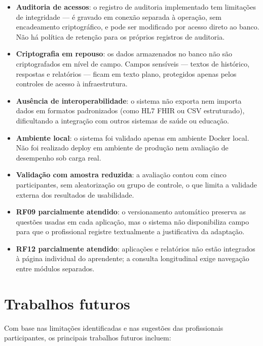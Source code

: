 \begin{itemize}
    \item \textbf{Auditoria de acessos}: o registro de auditoria implementado tem limitações de integridade — é gravado em conexão separada à operação, sem encadeamento criptográfico, e pode ser modificado por acesso direto ao banco. Não há política de retenção para os próprios registros de auditoria.
    \item \textbf{Criptografia em repouso}: os dados armazenados no banco não são criptografados em nível de campo. Campos sensíveis — textos de histórico, respostas e relatórios — ficam em texto plano, protegidos apenas pelos controles de acesso à infraestrutura.
    \item \textbf{Ausência de interoperabilidade}: o sistema não exporta nem importa dados em formatos padronizados (como HL7 FHIR ou CSV estruturado), dificultando a integração com outros sistemas de saúde ou educação.
    \item \textbf{Ambiente local}: o sistema foi validado apenas em ambiente Docker local. Não foi realizado deploy em ambiente de produção nem avaliação de desempenho sob carga real.
    \item \textbf{Validação com amostra reduzida}: a avaliação contou com cinco participantes, sem aleatorização ou grupo de controle, o que limita a validade externa dos resultados de usabilidade.
    \item \textbf{RF09 parcialmente atendido}: o versionamento automático preserva as questões usadas em cada aplicação, mas o sistema não disponibiliza campo para que o profissional registre textualmente a justificativa da adaptação.
    \item \textbf{RF12 parcialmente atendido}: aplicações e relatórios não estão integrados à página individual do aprendente; a consulta longitudinal exige navegação entre módulos separados.
\end{itemize}

\section{Trabalhos futuros}

Com base nas limitações identificadas e nas sugestões das profissionais participantes, os principais trabalhos futuros incluem:

